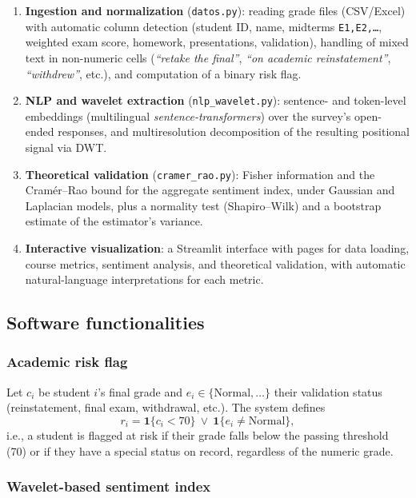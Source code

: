 \documentclass[11pt,a4paper,oneside]{article}
\theoremstyle{definition}
\begin{document}
\begin{enumerate}[leftmargin=1.4em]
  \item \textbf{Ingestion and normalization} (\texttt{datos.py}): reading grade files
  (CSV/Excel) with automatic column detection (student ID, name, midterms
  \texttt{E1,E2,\dots}, weighted exam score, homework, presentations, validation), handling of
  mixed text in non-numeric cells (\emph{``retake the final''}, \emph{``on academic
  reinstatement''}, \emph{``withdrew''}, etc.), and computation of a binary risk flag.
  \item \textbf{NLP and wavelet extraction} (\texttt{nlp\_wavelet.py}): sentence- and
  token-level embeddings (multilingual \emph{sentence-transformers}) over the survey's
  open-ended responses, and multiresolution decomposition of the resulting positional signal
  via DWT.
  \item \textbf{Theoretical validation} (\texttt{cramer\_rao.py}): Fisher information and the
  Cram\'er--Rao bound for the aggregate sentiment index, under Gaussian and Laplacian models,
  plus a normality test (Shapiro--Wilk) and a bootstrap estimate of the estimator's variance.
  \item \textbf{Interactive visualization}: a Streamlit interface with pages for data loading,
  course metrics, sentiment analysis, and theoretical validation, with automatic natural-language
  interpretations for each metric.
\end{enumerate}

\subsection{Software functionalities}
\label{sec:funcionalidades}

\subsubsection{Academic risk flag}

Let $c_i$ be student $i$'s final grade and $e_i\in\{\text{Normal},\ldots\}$ their validation
status (reinstatement, final exam, withdrawal, etc.). The system defines
\[
r_i = \mathbf{1}\{c_i < 70\} \ \vee\ \mathbf{1}\{e_i \neq \text{Normal}\},
\]
i.e., a student is flagged at risk if their grade falls below the passing threshold (70) or if
they have a special status on record, regardless of the numeric grade.

\subsubsection{Wavelet-based sentiment index}
\label{sec:indice}
\end{document}
